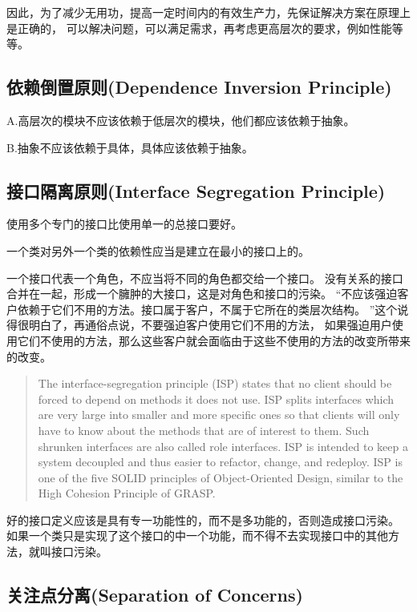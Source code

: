 \documentclass{book}
\begin{document}
因此，为了减少无用功，提高一定时间内的有效生产力，先保证解决方案在原理上是正确的，
可以解决问题，可以满足需求，再考虑更高层次的要求，例如性能等等。


\subsection{依赖倒置原则(Dependence Inversion Principle)}

A.高层次的模块不应该依赖于低层次的模块，他们都应该依赖于抽象。

B.抽象不应该依赖于具体，具体应该依赖于抽象。

\subsection{接口隔离原则(Interface Segregation Principle)}

使用多个专门的接口比使用单一的总接口要好。

一个类对另外一个类的依赖性应当是建立在最小的接口上的。

一个接口代表一个角色，不应当将不同的角色都交给一个接口。
没有关系的接口合并在一起，形成一个臃肿的大接口，这是对角色和接口的污染。
“不应该强迫客户依赖于它们不用的方法。接口属于客户，不属于它所在的类层次结构。
”这个说得很明白了，再通俗点说，不要强迫客户使用它们不用的方法，
如果强迫用户使用它们不使用的方法，那么这些客户就会面临由于这些不使用的方法的改变所带来的改变。

\begin{quotation}
The interface-segregation principle (ISP) states that no client should be forced to 
depend on methods it does not use. 
ISP splits interfaces which are very large into smaller and more specific ones 
so that clients will only have to know about the methods that are of interest to them. 
Such shrunken interfaces are also called role interfaces. 
ISP is intended to keep a system decoupled and thus easier to refactor, 
change, and redeploy. ISP is one of the five SOLID principles of Object-Oriented Design,
 similar to the High Cohesion Principle of GRASP.
\end{quotation}

好的接口定义应该是具有专一功能性的，而不是多功能的，否则造成接口污染。
如果一个类只是实现了这个接口的中一个功能，而不得不去实现接口中的其他方法，就叫接口污染。

\subsection{关注点分离(Separation of Concerns)}
\end{document}

